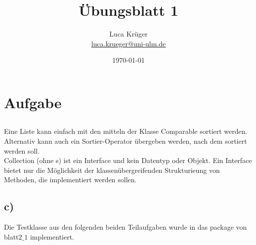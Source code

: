 \documentclass[a4paper]{article}
\title{Übungsblatt 1}
\author{Luca Krüger \\ \href{mailto:luca.krueger@uni-ulm.de}{luca.krueger@uni-ulm.de}}
\date{\today}
\begin{document}
\maketitle
\section*{Aufgabe \thesection}
	
	\subsection{}
	
	Eine Liste kann einfach mit den mitteln der Klasse Comparable sortiert werden. Alternativ kann auch ein Sortier-Operator übergeben werden, nach dem sortiert werden soll.\\
	Collection (ohne s) ist ein Interface und kein Datentyp oder Objekt. Ein Interface bietet nur die Möglichkeit der klassenübergreifenden Strukturieung von Methoden, die implementiert werden sollen. 

	\subsection{c)}
	Die Testklasse aus den folgenden beiden Teilaufgaben wurde in das package von blatt$2\_1$ implementiert.
	
	
\end{document}
